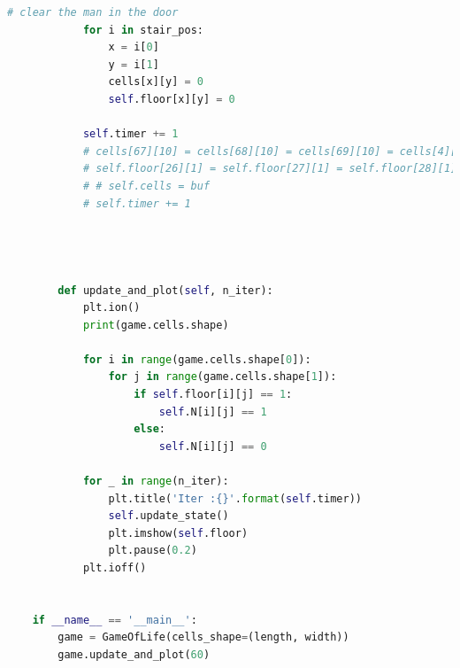 \documentclass{mcmthesis}
\begin{document}
\begin{lstlisting}[language=Python]
            # clear the man in the door
            for i in stair_pos:
                x = i[0]
                y = i[1]
                cells[x][y] = 0
                self.floor[x][y] = 0
    
            self.timer += 1
            # cells[67][10] = cells[68][10] = cells[69][10] = cells[4][29] = cells[9][29] = 0
            # self.floor[26][1] = self.floor[27][1] = self.floor[28][1] = self.floor[4][29] = self.floor[9][29] = 0
            # # self.cells = buf
            # self.timer += 1
    
    
    
    
        def update_and_plot(self, n_iter):
            plt.ion()
            print(game.cells.shape)
    
            for i in range(game.cells.shape[0]):
                for j in range(game.cells.shape[1]):
                    if self.floor[i][j] == 1:
                        self.N[i][j] == 1
                    else:
                        self.N[i][j] == 0
    
            for _ in range(n_iter):
                plt.title('Iter :{}'.format(self.timer))
                self.update_state()
                plt.imshow(self.floor)
                plt.pause(0.2)
            plt.ioff()
    
    
    if __name__ == '__main__':
        game = GameOfLife(cells_shape=(length, width))
        game.update_and_plot(60)
\end{lstlisting}
\end{document}
